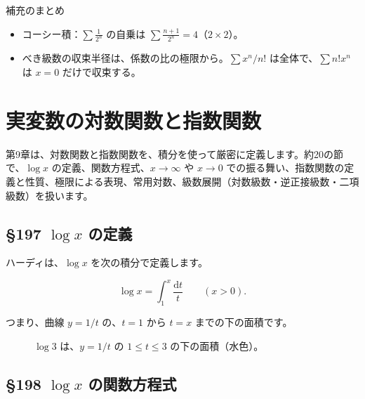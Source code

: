 \documentclass[a4paper,11pt,openany]{ltjsbook}
\newcommand{\dd}{\mathrm{d}}
\begin{document}
\begin{pointbox}{補充のまとめ}
\begin{itemize}[leftmargin=*]
\item コーシー積：$\sum\tfrac1{2^n}$ の自乗は $\sum\tfrac{n+1}{2^n}=4$（$2\times2$）。
\item べき級数の収束半径は、係数の比の極限から。$\sum x^n/n!$ は全体で、$\sum n!x^n$ は $x=0$ だけで収束する。
\end{itemize}
\end{pointbox}

\chapter{実変数の対数関数と指数関数}

第9章は、対数関数と指数関数を、積分を使って厳密に定義します。約20の節で、$\log x$ の定義、関数方程式、$x\to\infty$ や $x\to0$ での振る舞い、指数関数の定義と性質、極限による表現、常用対数、級数展開（対数級数・逆正接級数・二項級数）を扱います。

\section{§197 $\log x$ の定義}

ハーディは、$\log x$ を次の積分で定義します。

\[
\log x=\int_1^x\frac{\dd t}{t}\qquad(x>0).
\]

つまり、曲線 $y=1/t$ の、$t=1$ から $t=x$ までの下の面積です。

\begin{figure}[htbp]
\centering
{}
\caption{$\log3$ は、$y=1/t$ の $1\le t\le3$ の下の面積（水色）。}
\end{figure}

\section{§198 $\log x$ の関数方程式}
\end{document}
